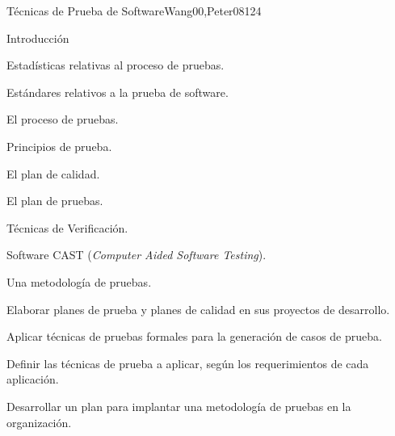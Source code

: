 \begin{syllabus}
\begin{unit}{Técnicas de Prueba de Software}{Wang00,Peter08}{12}{4}
\begin{topics}
      \item Introducción
      \item Estadísticas relativas al proceso de pruebas.
      \item Estándares relativos a la prueba de software.
      \item El proceso de pruebas.
      \begin{inparaenum}
         \item Principios de prueba.
         \item El plan de calidad.
         \item El plan de pruebas.
         \item Técnicas de Verificación.
      \end{inparaenum}
      \item Software CAST (\textit{Computer Aided Software Testing}).
      \item Una metodología de pruebas.
   \end{topics}

   \begin{unitgoals}
      \item Elaborar planes de prueba y planes de calidad en sus proyectos de desarrollo.
      \item Aplicar técnicas de pruebas formales para la generación de casos de prueba.
      \item Definir las técnicas de prueba a aplicar, según los requerimientos de cada aplicación.
      \item Desarrollar un plan para implantar una metodología de pruebas en la organización.
   \end{unitgoals}
\end{unit}



\begin{coursebibliography}
\end{coursebibliography}

\end{syllabus}
